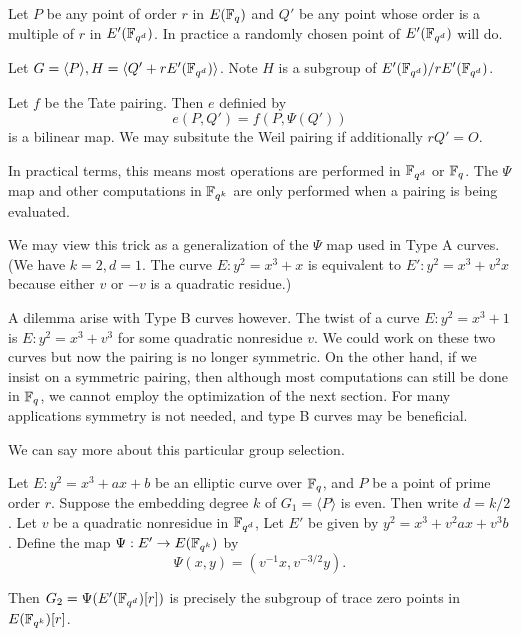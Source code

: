 Let $P$ be any point of order $r$ in $E(\mathbb{F}_q)$ and
$Q'$ be any point whose order is a multiple of $r$ in $E'(\mathbb{F}_{q^d})$.
In practice a randomly chosen point of $E'(\mathbb{F}_{q^d})$ will do.

Let $G = \langle P \rangle, H = \langle Q' + r E'(\mathbb{F}_{q^d}) \rangle$.
Note $H$ is a subgroup of $E'(\mathbb{F}_{q^d}) / rE'(\mathbb{F}_{q^d})$.

Let $f$ be the Tate pairing.
Then $e$ definied by
\[e(P,Q') = f(P, \Psi(Q')) \]
is a bilinear map.
We may subsitute the Weil pairing if additionally
$r Q' = O$.

In practical terms, this means most operations are performed in
$\mathbb{F}_{q^d}$  or $\mathbb{F}_q$. The $\Psi$ map and
other computations in $\mathbb{F}_{q^k}$ are only performed
when a pairing is being evaluated.

We may view this trick as a
generalization of the $\Psi$ map used in Type A curves.
(We have $k =2 , d = 1$.
The curve $E : y^2 = x^3 + x$ is equivalent to $E' : y^2 = x^3 + v^2 x$
because either $v$ or $-v$ is a quadratic residue.)

A dilemma arise with Type B curves however. The twist
of a curve $E : y^2 = x^3 + 1 $ is $E: y^2 = x^3 + v^3 $ for some
quadratic nonresidue $v$. We could work on these two curves but now
the pairing is no longer symmetric. On the other hand, if we insist on
a symmetric pairing, then although most computations can still be done
in $\mathbb{F}_q$, we cannot employ the optimization of the next section. For
many applications symmetry is not needed, and type B curves may be beneficial.

We can say more about this particular group selection.

\begin{theorem}
Let $E : y^2 = x^3 + a x + b$ be an elliptic curve over $\mathbb{F}_q$,
and $P$ be a point of prime order $r$.
Suppose the embedding degree $k$ of $G_1 = \langle P \rangle$ is even.
Then write $d = k / 2$. Let $v$ be a quadratic nonresidue in $\mathbb{F}_{q^d}$,
Let $E'$ be given by $y^2 = x^3 + v^2 a x + v^3 b$.
Define the map $\Psi:E'\rightarrow E(\mathbb{F}_{q^k})$ by
\[ \Psi(x,y) = (v^{-1}x, v^{-3/2}y) . \]

Then $G_2 = \Psi(E'(\mathbb{F}_{q^d})[r])$ is precisely the subgroup of trace zero points
in $E(\mathbb{F}_{q^k})[r]$.
\end{theorem}

